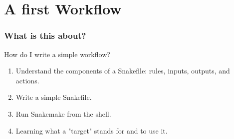 \section{A first Workflow}
{   
}

\begin{frame}
  \frametitle{What is this about?}
   \begin{question}[Questions]
   	 How do I write a simple workflow?
   \end{question}
   \begin{docs}[Objectives]
   	 \begin{enumerate}
                      \item Understand the components of a Snakefile: rules, inputs, outputs, and actions.
                      \item Write a simple Snakefile.
                      \item Run Snakemake from the shell.
                      \item Learning what a "target" stands for and to use it.
     \end{enumerate}
   \end{docs}
\end{frame}

